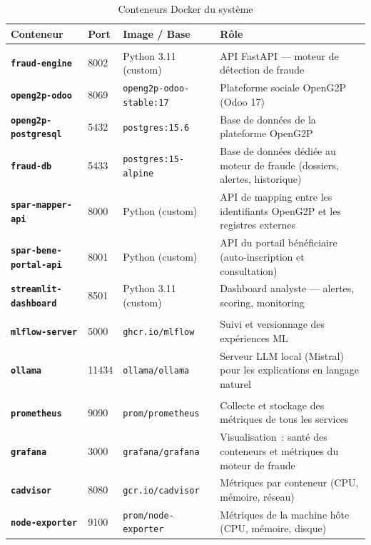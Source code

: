 \documentclass[a4paper, oneside, 12pt]{book}
\newcommand{\thead}[1]{\cellcolor{EYdark}\textcolor{white}{\textbf{#1}}}
\renewcommand{\thead}[1]{\cellcolor{EYyellow}\textcolor{EYdark}{\textbf{#1}}}
\begin{document}
\begin{table}[H]
\centering
\caption{Conteneurs Docker du système}
\label{tab:conteneurs}
\renewcommand{\arraystretch}{1.4}
\begin{tabular}{>{\bfseries}p{3.4cm} p{1.6cm} p{3.4cm} p{5.5cm}}
\hline
\thead{Conteneur} & \thead{Port} & \thead{Image / Base} & \thead{Rôle} \\
\hline
\multicolumn{4}{l}{{Cœur applicatif}} \\
\hline
\rowcolor{EYgray}
\texttt{fraud-engine} & 8002 & Python 3.11 (custom) & API FastAPI — moteur de détection de fraude \\
\texttt{openg2p-odoo} & 8069 & \texttt{openg2p-odoo-stable:17} & Plateforme sociale OpenG2P (Odoo 17) \\
\rowcolor{EYgray}
\texttt{openg2p-postgresql} & 5432 & \texttt{postgres:15.6} & Base de données de la plateforme OpenG2P \\
\texttt{fraud-db} & 5433 & \texttt{postgres:15-alpine} & Base de données dédiée au moteur de fraude (dossiers, alertes, historique) \\
\rowcolor{EYgray}
\texttt{spar-mapper-api} & 8000 & Python (custom) & API de mapping entre les identifiants OpenG2P et les registres externes \\
\texttt{spar-bene-portal-api} & 8001 & Python (custom) & API du portail bénéficiaire (auto-inscription et consultation) \\
\rowcolor{EYgray}
\texttt{streamlit-dashboard} & 8501 & Python 3.11 (custom) & Dashboard analyste — alertes, scoring, monitoring \\
\hline
\multicolumn{4}{l}{{Services de support}} \\
\hline
\texttt{mlflow-server} & 5000 & \texttt{ghcr.io/mlflow} & Suivi et versionnage des expériences ML \\
\rowcolor{EYgray}
\texttt{ollama} & 11434 & \texttt{ollama/ollama} & Serveur LLM local (Mistral) pour les explications en langage naturel \\
\hline
\multicolumn{4}{l}{{Pile d'observabilité}} \\
\hline
\texttt{prometheus} & 9090 & \texttt{prom/prometheus} & Collecte et stockage des métriques de tous les services \\
\rowcolor{EYgray}
\texttt{grafana} & 3000 & \texttt{grafana/grafana} & Visualisation~: santé des conteneurs et métriques du moteur de fraude \\
\texttt{cadvisor} & 8080 & \texttt{gcr.io/cadvisor} & Métriques par conteneur (CPU, mémoire, réseau) \\
\rowcolor{EYgray}
\texttt{node-exporter} & 9100 & \texttt{prom/node-exporter} & Métriques de la machine hôte (CPU, mémoire, disque) \\
\hline
\end{tabular}
\end{table}
\end{document}
